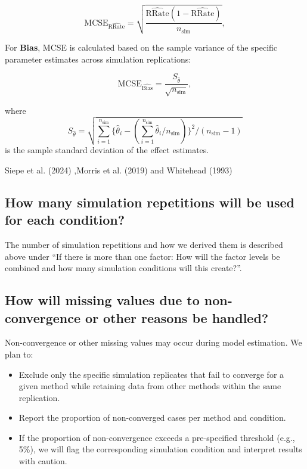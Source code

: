 \documentclass[
  man,
  floatsintext]{apa7}
\providecommand{\tightlist}{%
  \setlength{\itemsep}{0pt}\setlength{\parskip}{0pt}}
\begin{document}
\[
\text{MCSE}_{\widehat{\text{RRate}}} = \sqrt{\frac{\widehat{\text{RRate}} (1 - \widehat{\text{RRate}})}{n_{\text{sim}}}},
\]

For \textbf{Bias}, MCSE is calculated based on the sample variance of
the specific parameter estimates across simulation replications:

\[
\text{MCSE}_{\widehat{\text{Bias}}} = \frac{S_{\hat{\theta}}}{\sqrt{n_{\text{sim}}}},
\]

where \[
S_{\hat{\theta}} = \sqrt{\sum_{i=1}^{n_{\text{sim}}}{ \{\hat{\theta}_i - (\sum_{i=1}^{n_{\text{sim}}}\hat{\theta}_i/n_{\text{sim}})\}^2}/(n_{\text{sim}} - 1)}
\] is the sample standard deviation of the effect estimates.

Siepe et al. (2024) ,Morris et al. (2019) and Whitehead (1993)

\subsection{How many simulation repetitions will be used for each
condition?}\label{how-many-simulation-repetitions-will-be-used-for-each-condition}

The number of simulation repetitions and how we derived them is
described above under ``If there is more than one factor: How will the
factor levels be combined and how many simulation conditions will this
create?''.

\subsection{How will missing values due to non-convergence or other
reasons be
handled?}\label{how-will-missing-values-due-to-non-convergence-or-other-reasons-be-handled}

Non-convergence or other missing values may occur during model
estimation. We plan to:

\begin{itemize}
\tightlist
\item
  Exclude only the specific simulation replicates that fail to converge
  for a given method while retaining data from other methods within the
  same replication.
\item
  Report the proportion of non-converged cases per method and condition.
\item
  If the proportion of non-convergence exceeds a pre-specified threshold
  (e.g., 5\%), we will flag the corresponding simulation condition and
  interpret results with caution.
\end{itemize}
\end{document}
